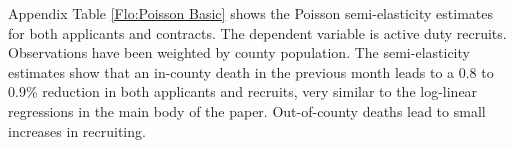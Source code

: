 \documentclass[12pt] {article}
\begin{document}
 




Appendix Table \ref{Flo:Poisson Basic} shows the Poisson semi-elasticity estimates for both applicants and contracts. The dependent variable is active duty recruits. Observations have been weighted by county population. The semi-elasticity estimates show that an in-county death in the previous month leads to a 0.8 to 0.9\% reduction in both applicants and recruits, very similar to the log-linear regressions in the main body of the paper. Out-of-county deaths lead to small increases in recruiting.
\end{document}
